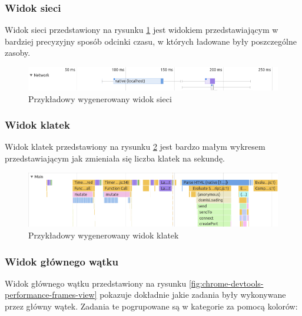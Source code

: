 \documentclass[polish, twoside, 12pt]{mwart}
\begin{document}
\subsubsection{Widok sieci}

Widok sieci przedstawiony na rysunku \ref{fig:chrome-devtools-performance-network-view} jest widokiem przedstawiającym w bardziej precyzyjny sposób odcinki czasu, w których ładowane były poszczególne zasoby.

\begin{figure}[ht]
  \includegraphics[width=\textwidth]{chrome-devtools-performance-network-view.png}
  \caption{Przykładowy wygenerowany widok sieci}
  \label{fig:chrome-devtools-performance-network-view}
\end{figure}

\subsubsection{Widok klatek}

Widok klatek przedstawiony na rysunku \ref{fig:chrome-devtools-performance-main-view} jest bardzo małym wykresem przedstawiającym jak zmieniała się liczba klatek na sekundę.

\begin{figure}[ht]
  \includegraphics[width=\textwidth]{chrome-devtools-performance-main-view.png}
  \caption{Przykładowy wygenerowany widok klatek}
  \label{fig:chrome-devtools-performance-main-view}
\end{figure}

\subsubsection{Widok głównego wątku}

Widok głównego wątku przedstawiony na rysunku \ref{fig:chrome-devtools-performance-frames-view} pokazuje dokładnie jakie zadania były wykonywane przez główny wątek. Zadania te pogrupowane są w kategorie za pomocą kolorów:
\end{document}
